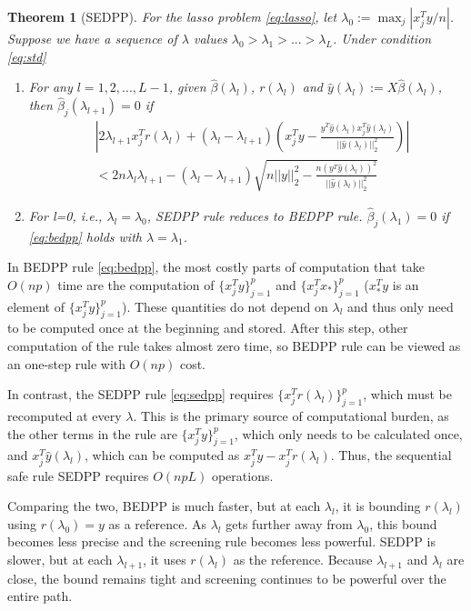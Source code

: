 \documentclass[]{interact}
\theoremstyle{plain}%
\newtheorem{theorem}{Theorem}[section]
\theoremstyle{definition}
\theoremstyle{remark}
\providecommand{\lam}{\lambda}
\begin{document}
\begin{theorem}[SEDPP]
    For the lasso problem \eqref{eq:lasso}, let $\lambda_0:=\max_j|x_j^Ty/n|$. Suppose we have a sequence of $\lambda$ values $\lambda_0>\lambda_1>...>\lambda_L$. Under condition \eqref{eq:std}
    \begin{enumerate}
        \item For any $l=1,2,...,L-1$, given $\hat{\beta}(\lambda_l)$, $r(\lambda_l)$ and $\hat{y}(\lambda_l):=X\hat{\beta}(\lambda_l)$, then $\hat{\beta}_j(\lambda_{l+1})=0$ if
        \begin{equation}
            \label{eq:sedpp}
            \begin{split}
                &\left|2\lambda_{l+1}x_j^Tr(\lambda_l)+(\lambda_l-\lambda_{l+1})\left( x_j^Ty-\frac{y^T\hat{y}(\lambda_l)x_j^T\hat{y}(\lambda_l)}{||\hat{y}(\lambda_l)||_2^2}\right)\right|\\&<2n\lambda_l\lambda_{l+1}-(\lambda_l-\lambda_{l+1})\sqrt{n||y||_2^2-\frac{n(y^T\hat{y}(\lambda_l))^2}{||\hat{y}(\lambda_l)||_2^2}}
            \end{split}
        \end{equation}
        \item For l=0, i.e., $\lambda_l=\lambda_0$, SEDPP rule reduces to BEDPP rule. $\hat{\beta}_j(\lambda_1)=0$ if \eqref{eq:bedpp} holds with $\lambda=\lambda_1$.
    \end{enumerate}
\end{theorem}

In BEDPP rule \eqref{eq:bedpp}, the most costly parts of computation that take $O(np)$ time are the computation of $\{x_j^Ty\}_{j=1}^p$ and $\{x_j^Tx_*\}_{j=1}^p$ ($x_*^Ty$ is an element of $\{x_j^Ty\}_{j=1}^p$). These quantities do not depend on $\lambda_l$ and thus only need to be computed once at the beginning and stored. After this step, other computation of the rule takes almost zero time, so BEDPP rule can be viewed as an one-step rule with $O(np)$ cost.

In contrast, the SEDPP rule \eqref{eq:sedpp} requires $\{x_j^Tr(\lambda_l)\}_{j=1}^p$, which must be recomputed at every $\lam$.  This is the primary source of computational burden, as the other terms in the rule are $\{x_j^Ty\}_{j=1}^p$, which only needs to be calculated once, and $x_j^T\hat{y}(\lambda_l)$, which can be computed as $x_j^Ty-x_j^Tr(\lambda_l)$. Thus, the sequential safe rule SEDPP requires $O(npL)$ operations.

Comparing the two, BEDPP is much faster, but at each $\lambda_l$, it is bounding $r(\lambda_l)$ using $r(\lambda_0)=y$ as a reference. As $\lambda_l$ gets further away from $\lambda_0$, this bound becomes less precise and the screening rule becomes less powerful. SEDPP is slower, but at each $\lambda_{l+1}$, it uses $r(\lambda_{l})$ as the reference. Because $\lambda_{l+1}$ and $\lambda_l$ are close, the bound remains tight and screening continues to be powerful over the entire path.
\end{document}
